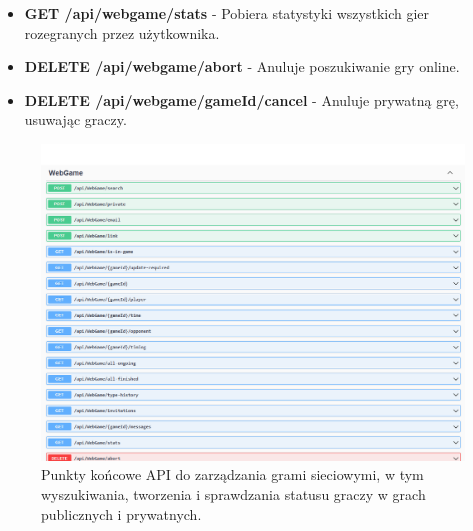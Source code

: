 \documentclass[12pt,a4paper]{article}
\begin{document}
\begin{itemize}
\begin{itemize}
        \item \textbf{GET /api/webgame/stats} - Pobiera statystyki wszystkich gier rozegranych przez użytkownika. 
        \item \textbf{DELETE /api/webgame/abort} - Anuluje poszukiwanie gry online. 
        \item \textbf{DELETE /api/webgame/{gameId}/cancel} - Anuluje prywatną grę, usuwając graczy. 
    \end{itemize}
    \begin{figure}[h!]
        \centering
        \includegraphics[width=1\textwidth]{zdj/webgame_controller.png}
        \caption{Punkty końcowe API do zarządzania grami sieciowymi, w tym wyszukiwania, tworzenia i sprawdzania statusu graczy w grach publicznych i prywatnych.}
        
    \end{figure}

\newpage


\end{itemize}
\end{document}
